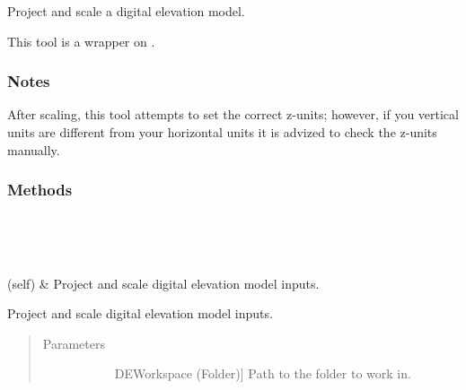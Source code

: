 \documentclass[letterpaper,10pt,english]{sphinxmanual}
\begin{document}
\begin{fulllineitems}
\label{\detokenize{StreamStats_DataPrep:StreamStats_DataPrep.ProjScale}}
Project and scale a digital elevation model.

This tool is a wrapper on {\hyperref[\detokenize{elevationTools:elevationTools.projScale}]{}}.
\subsubsection*{Notes}

After scaling, this tool attempts to set the correct z-units; however, if you vertical units are different from your horizontal units it is advized to check the z-units manually.
\subsubsection*{Methods}


\begin{savenotes}\sphinxatlongtablestart\begin{longtable}{}
\hline

\endfirsthead

%
{}\\
\hline

\endhead

\hline
{}\\
\endfoot

\endlastfoot

{\hyperref[\detokenize{StreamStats_DataPrep:StreamStats_DataPrep.ProjScale.getParameterInfo}]{}}(self)
&
Project and scale digital elevation model inputs.
\\
\hline
\end{longtable}\sphinxatlongtableend\end{savenotes}

\begin{fulllineitems}
\label{\detokenize{StreamStats_DataPrep:StreamStats_DataPrep.ProjScale.getParameterInfo}}
Project and scale digital elevation model inputs.
\begin{quote}\begin{description}
\item[{Parameters}] \leavevmode\begin{description}
\item[{}] \leavevmode{[}DEWorkspace (Folder){]}
Path to the folder to work in.


\end{description}
\end{description}
\end{quote}
\end{fulllineitems}
\end{fulllineitems}
\end{document}
